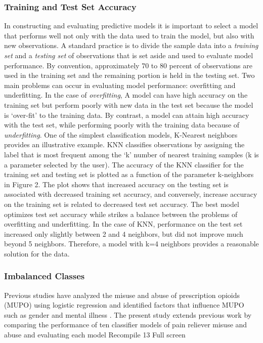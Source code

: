 \subsubsection{Training and Test Set Accuracy}
In constructing and evaluating predictive models it is important to select 
a model that performs well not only with the data used to train the model, 
but also with new observations. A standard practice is to divide the sample 
data into a \emph{training set} and a \emph{testing set} of observations that 
is set aside and used to evaluate model performance. By convention, approximately 
70 to 80 percent of observations are used in the training set and the remaining 
portion is held in the testing set. Two main problems can occur in evaluating 
model performance: overfitting and underfitting. In the case of 
\emph{overfitting}, A model can have high accuracy on the training set 
but perform poorly with new data in the test set because the model is 
`over-fit' to the training data. By contrast, a model can attain high 
accuracy with the test set, while performing poorly with the training data 
because of \emph{underfitting}. One of the simplest classification models, 
K-Nearest neighbors provides an illustrative example. KNN classifies 
observations by assigning the label that is most frequent among the `k' 
number of nearest training samples (k is a parameter selected by the user). 
The accuracy of the KNN classifier for the training set and testing set is 
plotted as a function of the parameter k-neighbors in Figure 2. The plot 
shows that increased accuracy on the testing set is associated with 
decreased training set accuracy, and conversely, increase accuracy on 
the training set is related to decreased test set accuracy. The best model 
optimizes test set accuracy while strikes a balance between the problems of 
overfitting and underfitting. In the case of KNN, performance on the test set 
increased only slightly between 2 and 4 neighbors, but did not improve much 
beyond 5 neighbors. Therefore, a model with k=4 neighbors provides a 
reasonable solution for the data. 
\subsubsection{Imbalanced Classes}
Previous studies have analyzed the misuse and abuse of prescription opioids
(MUPO) using logistic regression and identified factors that influence MUPO 
such as gender and mental illness \cite{rice12, unick13, jones15, mccabe12}. 
The present study extends previous work by comparing the performance of ten 
classifier models of pain reliever misuse and abuse and evaluating each model 
  Recompile
13
Full screen
